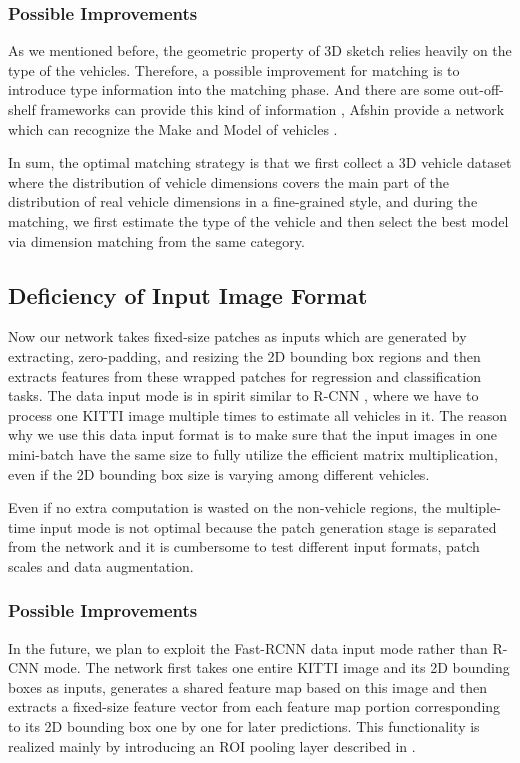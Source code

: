 \documentclass[a4paper,12pt]{article}
\begin{document}
\subsubsection{Possible Improvements}
As we mentioned before, the geometric property of 3D sketch relies heavily on the type of the vehicles. Therefore, a possible improvement for matching is to introduce type information into the matching phase. And there are some out-off-shelf frameworks can provide this kind of information \cite{DBLP:journals/corr/YangLLT15, 7780697, 7410527, DBLP:journals/corr/DehghanMSO17}, \ie Afshin \etal provide a network which can recognize the Make and Model of vehicles \cite{DBLP:journals/corr/DehghanMSO17}. 

In sum, the optimal matching strategy is that we first collect a 3D vehicle dataset where the distribution of vehicle dimensions covers the main part of the distribution of real vehicle dimensions in a fine-grained style, and during the matching, we first estimate the type of the vehicle and then select the best model via dimension matching from the same category. 

\subsection{Deficiency of Input Image Format}

Now our network takes fixed-size patches as inputs which are generated by extracting, zero-padding, and resizing the 2D bounding box regions and then extracts features from these wrapped patches for regression and classification tasks. The data input mode is in spirit similar to R-CNN \cite{DBLP:journals/corr/GirshickDDM13}, where we have to process one KITTI image multiple times to estimate all vehicles in it. The reason why we use this data input format is to make sure that the input images in one mini-batch have the same size to fully utilize the efficient matrix multiplication, even if the 2D bounding box size is varying among different vehicles.

Even if no extra computation is wasted on the non-vehicle regions, the multiple-time input mode is not optimal because the patch generation stage is separated from the network and it is cumbersome to test different input formats, \ie patch scales and data augmentation.

\subsubsection{Possible Improvements}
In the future, we plan to exploit the Fast-RCNN \cite{DBLP:journals/corr/Girshick15} data input mode rather than R-CNN mode. The network first takes one entire KITTI image and its 2D bounding boxes as inputs, generates a shared feature map based on this image and then extracts a fixed-size feature vector from each feature map portion corresponding to its 2D bounding box one by one for later predictions. This functionality is realized mainly by introducing an ROI pooling layer described in \cite{DBLP:journals/corr/Girshick15}.
\end{document}
